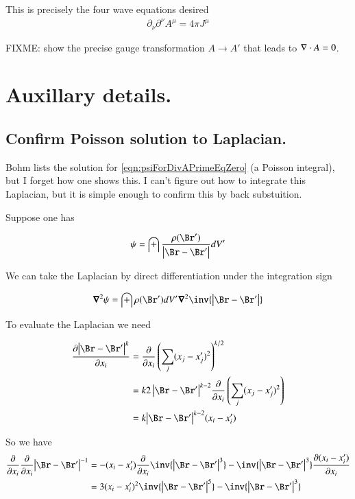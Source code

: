 \documentclass{article}
\begin{document}
This is precisely the four wave equations desired
\begin{align*}
\partial_\nu\partial^\nu A^\mu = 4 \pi J^\mu
\end{align*}

FIXME: show the precise gauge transformation $A \rightarrow A'$ that leads to $\nabla \cdot A = 0$.

\section{ Auxillary details. }

\subsection{ Confirm Poisson solution to Laplacian. }

Bohm lists the solution for \ref{eqn:psiForDivAPrimeEqZero} (a Poisson integral), but I forget how one shows this.  I can't figure out how to integrate this Laplacian, but it is simple enough to confirm this by back substuition.

Suppose one has

\begin{align*}
\psi = \int \frac{\rho(\Br')}{\Abs{\Br - \Br'}} dV'
\end{align*}

We can take the Laplacian by direct differentiation under the integration sign

\begin{align*}
\spacegrad^2 \psi = \int {\rho(\Br')} dV' \spacegrad^2 \inv{\Abs{\Br - \Br'}}
\end{align*}

To evaluate the Laplacian we need

\begin{align*}
\PD{x_i}{\Abs{\Br - \Br'}^k} 
&= \PD{x_i}{} \left(\sum_j (x_j - x_j')^2 \right)^{k/2} \\
&= k { 2\Abs{\Br - \Br'}^{k-2}} \PD{x_i}{} \left(\sum_j (x_j - x_j')^2 \right) \\
&= k { \Abs{\Br - \Br'}^{k-2}} (x_i - x_i')
\end{align*}

So we have
\begin{align*}
\PD{x_i}{} \PD{x_i}{} {\Abs{\Br - \Br'}^{-1}} 
&= 
- (x_i - x_i') \PD{x_i}{}{ \inv{ \Abs{\Br - \Br'}^3} } 
- \inv{ \Abs{\Br - \Br'}^3} \PD{x_i}{ (x_i - x_i') } \\
&= 
3 (x_i - x_i')^2 { \inv{ \Abs{\Br - \Br'}^5} } 
- \inv{ \Abs{\Br - \Br'}^3} \\
\end{align*}
\end{document}
